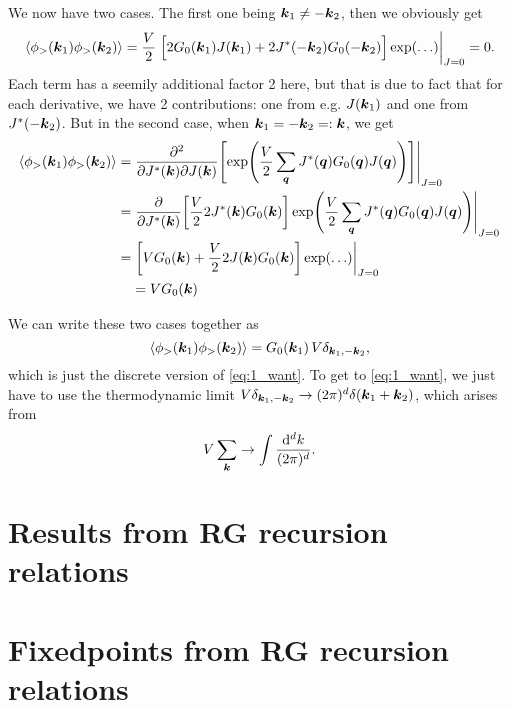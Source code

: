 \documentclass[11pt,letter, swedish, english
]{article}
\begin{document}
We now have two cases. The first one being $\vb*k_1\neq-\vb*k_2$, then
we obviously get
\begin{equation}
\begin{aligned}
\ev{\phi_>(\vb*k_1)\phi_>(\vb*k_2)} 
= \frac{V}{2}\eval{\Big[
2G_0(\vb*k_1)J(\vb*k_1) + 2J^*(-\vb*k_2)G_0(-\vb*k_2)
\Big]\exp(\ldots)}_{J=0} = 0.
\end{aligned}
\end{equation}
Each term has a seemily additional factor 2 here, but that is due to
fact that for each derivative, we have 2 contributions: one from e.g.
$J(\vb*k_1)$ and one from $J^*(-\vb*k_2)$.
But in the second case, when $\vb*k_1=-\vb*k_2=:\vb*k$, we get
\begin{equation}
\begin{aligned}
\ev{\phi_>(\vb*k_1)\phi_>(\vb*k_2)} 
=&\eval{\pdv[2]{}{J^*(\vb*k)}{J(\vb*k)}
\qty[\exp(\frac{V}{2} \sum_{\vb*q}
J^*(\vb*q)G_0(\vb*q)J(\vb*q))]}_{J=0}\\
=&\eval{\pdv{J^*(\vb*k)}\qty[\frac{V}{2} 
2J^*(\vb*k)G_0(\vb*k)]\exp(\frac{V}{2} \sum_{\vb*q}
J^*(\vb*q)G_0(\vb*q)J(\vb*q))
}_{J=0}\\
=&\eval{\qty[VG_0(\vb*k) + \frac{V}{2} 
2J(\vb*k)G_0(\vb*k)]\exp(\ldots)
}_{J=0}\\
&=VG_0(\vb*k)
\end{aligned}
\end{equation}

We can write these two cases together as
\begin{equation}
\ev{\phi_>(\vb*k_1)\phi_>(\vb*k_2)} 
=G_0(\vb*k_1) \,V\delta_{\vb*k_1, -\vb*k_2},
\end{equation}
which is just the discrete version of \eqref{eq:1_want}. To get to
\eqref{eq:1_want}, we just have to use the thermo\-dynamic limit
$V\delta_{\vb*k_1, -\vb*k_2} \to (2\pi)^d\delta(\vb*k_1+\vb*k_2)$,
which arises from 
\begin{equation}
V\sum_{\vb*k} \to \int\frac{\rd^dk}{(2\pi)^d}.
\end{equation}








\section{Results from RG recursion relations}





\section{Fixedpoints from RG recursion relations}
\end{document}

